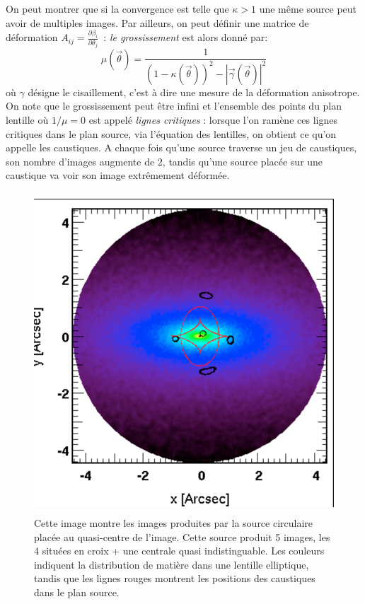 On peut montrer que si la convergence est telle que $\kappa >1$ une même source peut avoir de multiples images. Par ailleurs, on peut définir une matrice de déformation $A_{ij}=\frac{\partial \beta_i}{\partial \theta_j}$~: \textit{le grossissement} est alors donné par:
\begin{equation}
\mu(\vec{\theta})=\frac{1}{(1-\kappa(\vec{\theta}))^2 - |\vec{\gamma}(\vec{\theta})|^2}
\end{equation} 
où $\gamma$ désigne le cisaillement, c'est à dire une mesure de la déformation anisotrope. On note que le grossissement peut être infini et l'ensemble des points du plan lentille où $1/\mu=0$ est appelé \textit{lignes critiques} : lorsque l'on ramène ces lignes critiques dans le plan source, via l'équation des lentilles, on obtient ce qu'on appelle les caustiques. A chaque fois qu'une source traverse un jeu de caustiques, son nombre d'images augmente de 2, tandis qu'une source placée sur une caustique va voir son image extrêmement déformée.

\begin{figure}[htbp]
	\centering
		\includegraphics[height=12cm]{figs/SPL.png}
	\caption[Exemple de calcul de lentilles gravitationnelles]{Cette image montre les images produites par la source circulaire placée au quasi-centre de l'image. Cette source produit 5 images, les 4 situées en croix + une centrale quasi indistinguable. Les couleurs indiquent la distribution de matière dans une lentille elliptique, tandis que les lignes rouges montrent les positions des caustiques dans le plan source.} 
	\label{f:SPL}
\end{figure}


